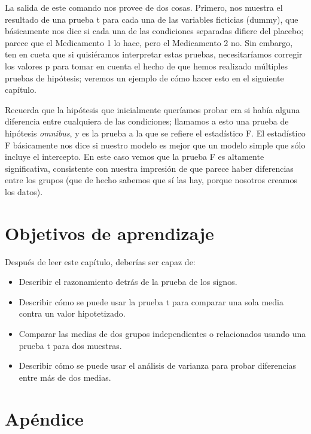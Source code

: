 \documentclass[
  12pt,
]{book}
\providecommand{\tightlist}{%
  \setlength{\itemsep}{0pt}\setlength{\parskip}{0pt}}
\theoremstyle{definition}
\theoremstyle{definition}
\theoremstyle{definition}
\theoremstyle{remark}
\begin{document}
La salida de este comando nos provee de dos cosas. Primero, nos muestra el resultado de una prueba t para cada una de las variables ficticias (dummy), que básicamente nos dice si cada una de las condiciones separadas difiere del placebo; parece que el Medicamento 1 lo hace, pero el Medicamento 2 no. Sin embargo, ten en cueta que si quisiéramos interpretar estas pruebas, necesitaríamos corregir los valores p para tomar en cuenta el hecho de que hemos realizado múltiples pruebas de hipótesis; veremos un ejemplo de cómo hacer esto en el siguiente capítulo.

Recuerda que la hipótesis que inicialmente queríamos probar era si había alguna diferencia entre cualquiera de las condiciones; llamamos a esto una prueba de hipótesis \emph{omnibus}, y es la prueba a la que se refiere el estadístico F. El estadístico F básicamente nos dice si nuestro modelo es mejor que un modelo simple que sólo incluye el intercepto. En este caso vemos que la prueba F es altamente significativa, consistente con nuestra impresión de que parece haber diferencias entre los grupos (que de hecho sabemos que sí las hay, porque nosotros creamos los datos).

\hypertarget{objetivos-de-aprendizaje}{%
\section{Objetivos de aprendizaje}\label{objetivos-de-aprendizaje}}

Después de leer este capítulo, deberías ser capaz de:

\begin{itemize}
\tightlist
\item
  Describir el razonamiento detrás de la prueba de los signos.
\item
  Describir cómo se puede usar la prueba t para comparar una sola media contra un valor hipotetizado.
\item
  Comparar las medias de dos grupos independientes o relacionados usando una prueba t para dos muestras.
\item
  Describir cómo se puede usar el análisis de varianza para probar diferencias entre más de dos medias.
\end{itemize}

\hypertarget{apuxe9ndice}{%
\section{Apéndice}\label{apuxe9ndice}}
\end{document}
